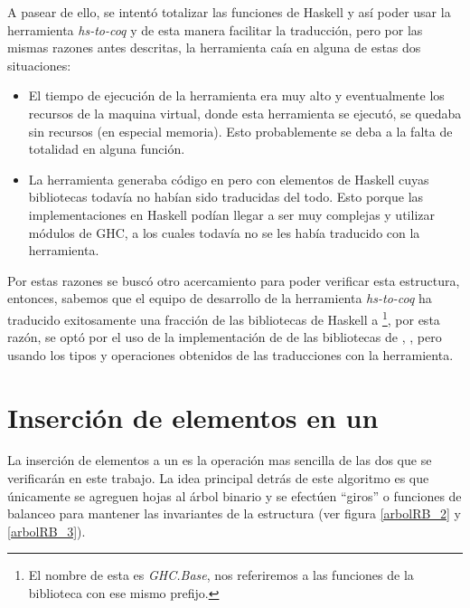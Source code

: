 A pasear de ello, se intent\'o totalizar las funciones de Haskell y así poder 
usar la herramienta \textit{hs-to-coq} y de esta manera facilitar la traducci\'on, pero por las mismas
razones antes descritas, la herramienta caía en alguna de estas dos situaciones:

\begin{itemize}
    \item El tiempo de ejecuci\'on de la herramienta era muy alto y eventualmente los recursos de
    la maquina virtual, donde esta herramienta se ejecut\'o, se quedaba sin recursos (en
    especial memoria). Esto probablemente se deba a la falta de totalidad en alguna función.
    \item La herramienta generaba c\'odigo en {\coq} pero con elementos de Haskell cuyas bibliotecas
    todavía no habían sido traducidas del todo. Esto porque las implementaciones en Haskell pod\'ian
    llegar a ser muy complejas y utilizar módulos de GHC, a los cuales todav\'ia no se les hab\'ia
    traducido con la herramienta.
\end{itemize}{}

Por estas razones se busc\'o otro acercamiento para poder verificar esta estructura, entonces,
sabemos que el equipo de desarrollo de la herramienta \textit{hs-to-coq} ha traducido exitosamente una
fracci\'on de las bibliotecas de Haskell a {\coq}\footnote{El nombre de esta es \textit{GHC.Base}, nos referiremos a las funciones de la biblioteca con ese mismo prefijo.}, por esta raz\'on, se opt\'o por el uso de la
implementación de {\arns} de las bibliotecas de {\coq}, \cite{MSetRBT}, pero usando los tipos y
operaciones obtenidos de las traducciones con la herramienta.

\section{Inserción de elementos en un {\arn}}

La inserci\'on de elementos a un {\arn} es la operaci\'on mas sencilla de las dos que se
verificar\'an en este trabajo. La idea principal detrás de este algoritmo es que \'unicamente se 
agreguen hojas al \'arbol binario y se efectúen ``giros'' o funciones de balanceo para 
mantener las invariantes de la estructura (ver figura \ref{arbolRB_2} y \ref{arbolRB_3}).

